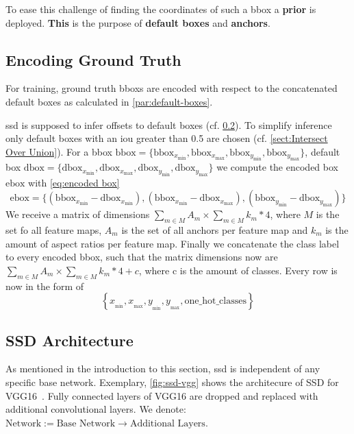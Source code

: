 To ease this challenge of finding the coordinates of such a \gls{bbox} a
\textbf{prior} is deployed. \textbf{This} is the purpose of \textbf{default boxes}
and \textbf{anchors}.

\subsection{Encoding Ground Truth} For training, ground truth \glspl{bbox}
are encoded with respect to the concatenated default boxes as calculated in
\cref{par:default-boxes}. 


\gls{ssd} is supposed to infer offsets to default
boxes (cf. \cref{subsect:SSD Architecture}). To simplify inference only default
boxes with an \gls{iou} greater than 0.5 are chosen (cf. \cref{sect:Intersect Over Union}). For a \gls{bbox}
\(\text{bbox}=\{\text{bbox}_{x_\text{min}}, \text{bbox}_{x_\text{max}}, \text{bbox}_{y_\text{min}}, \text{bbox}_{y_\text{max}}\}\), default box
\(\text{dbox}=\{\text{dbox}_{x_\text{min}}, \text{dbox}_{x_\text{max}}, \text{dbox}_{y_\text{min}}, \text{dbox}_{y_\text{max}}\}\) we compute the
encoded box \(\text{ebox}\) with \cref{eq:encoded box}
\begin{equation}
    \text{ebox}=\{(\text{bbox}_{x_\text{min}}-\text{dbox}_{x_\text{min}}), (\text{bbox}_{x_\text{min}}-\text{dbox}_{x_\text{max}}), (\text{bbox}_{y_\text{min}}-\text{dbox}_{y_\text{max}})\}\label{eq:encoded box}
\end{equation}
We receive a matrix of dimensions \(\sum_{m\in M}{A_m}\times \sum_{m\in M}{k_m*4}\),
where \(M\) is the set fo all \glspl{feature map}, \(A_m\) is the set of all anchors per
\gls{feature map} and \(k_m\) is the amount of aspect ratios per \gls{feature map}. Finally
we concatenate the class label to every encoded \gls{bbox}, such that the matrix
dimensions now are \(\sum_{m\in M}{A_m}\times \sum_{m\in M}{k_m*4+c}\), where c
is the amount of classes. Every row is now in the form of
\begin{equation}
    \left\{x_{_\text{min}}, x_{_\text{max}}, y_{_\text{min}}, y_{_\text{max}}, \text{one\_hot\_classes} \right\}
\end{equation}


\subsection{SSD Architecture}\label{subsect:SSD Architecture}
As mentioned in the introduction to this section, \gls{ssd} is independent of any
specific base network. Exemplary, \cref{fig:ssd-vgg} shows the architecure of
SSD for VGG16~\cite{Simonyan.2015}. Fully connected \glspl{layer} of VGG16 are
dropped and replaced with additional \glspl{convolutional layer}. We denote: 
\(\text{Network}:=\text{Base Network}\rightarrow \text{Additional Layers}\).

